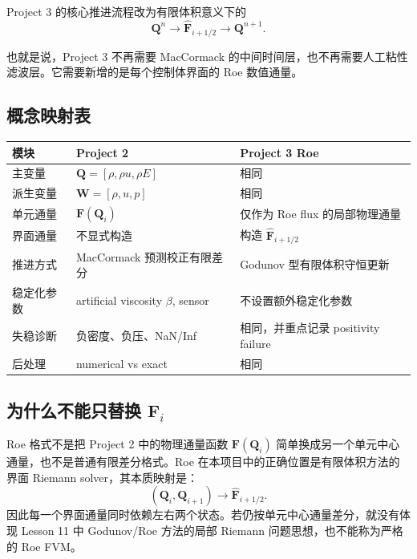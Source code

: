 Project 3 的核心推进流程改为有限体积意义下的
\begin{equation}
    \bm Q^n
    \longrightarrow
    \hat{\bm F}_{i+1/2}
    \longrightarrow
    \bm Q^{n+1}.
\end{equation}

也就是说，Project 3 不再需要 MacCormack 的中间时间层，也不再需要人工粘性滤波层。它需要新增的是每个控制体界面的 Roe 数值通量。

\subsection{概念映射表}

\begin{center}
\begin{tabular}{lll}
\toprule
模块 & Project 2 & Project 3 Roe\\
\midrule
主变量 & \(\bm Q=[\rho,\rho u,\rho E]\) & 相同\\
派生变量 & \(\bm W=[\rho,u,p]\) & 相同\\
单元通量 & \(\bm F(\bm Q_i)\) & 仅作为 Roe flux 的局部物理通量\\
界面通量 & 不显式构造 & 构造 \(\hat{\bm F}_{i+1/2}\)\\
推进方式 & MacCormack 预测校正有限差分 & Godunov 型有限体积守恒更新\\
稳定化参数 & artificial viscosity \(\beta\), sensor & 不设置额外稳定化参数\\
失稳诊断 & 负密度、负压、NaN/Inf & 相同，并重点记录 positivity failure\\
后处理 & numerical vs exact & 相同\\
\bottomrule
\end{tabular}
\end{center}

\subsection{为什么不能只替换 \texorpdfstring{\(\bm F_i\)}{Fi}}

Roe 格式不是把 Project 2 中的物理通量函数 \(\bm F(\bm Q_i)\) 简单换成另一个单元中心通量，也不是普通有限差分格式。Roe 在本项目中的正确位置是有限体积方法的界面 Riemann solver，其本质映射是：
\[
    (\bm Q_i,\bm Q_{i+1})
    \longrightarrow
    \hat{\bm F}_{i+1/2}.
\]
因此每一个界面通量同时依赖左右两个状态。若仍按单元中心通量差分，就没有体现 Lesson 11 中 Godunov/Roe 方法的局部 Riemann 问题思想，也不能称为严格的 Roe FVM。
